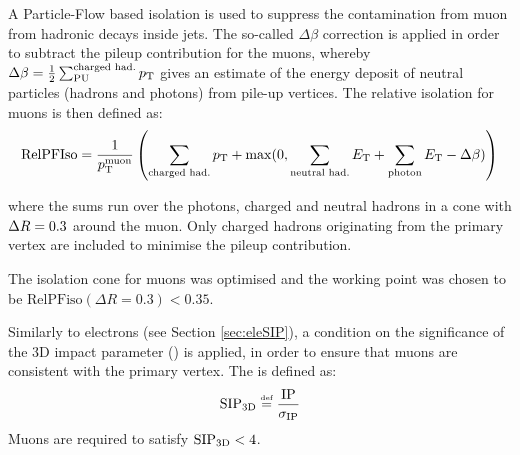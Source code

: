 A Particle-Flow based isolation is used to suppress the contamination from muon from hadronic decays inside jets.
The so-called $\Delta\beta$ correction is applied in order to subtract the pileup contribution for the muons, 
whereby $\Delta\beta = \frac{1}{2} \sum^\text{charged had.}_\text{PU} p_{\mathrm{T}}$ gives an estimate of the energy deposit of neutral particles (hadrons and photons) from pile-up vertices.
The relative isolation for muons is then defined as:
\begin{equation}
\text{RelPFIso} = \frac{1}{p_{\mathrm{T}}^\text{muon}} \left( \sum_\text{charged had.} p_{\mathrm{T}} + \max(0, \sum_\text{neutral had.} E_{\mathrm{T}} + \sum_\text{photon} E_{\mathrm{T}} - \Delta \beta) \right)
\label{eqn:mupfiso}
\end{equation}

where the sums run over the photons, charged and neutral hadrons in a cone with $\Delta R = 0.3$ around the muon.
Only charged hadrons originating from the primary vertex are included to minimise the pileup contribution.

The isolation cone for muons was optimised and the working point was chosen to be $\text{RelPFiso}(\Delta R = 0.3) < 0.35$. 

Similarly to electrons (see Section \ref{sec:eleSIP}), a condition on the significance of the 3D impact parameter (\SIPthreeD) is applied,
in order to ensure that muons are consistent with the primary vertex.
The \SIPthreeD{} is defined as:
\begin{equation}
\mathrm{SIP}_{\mathrm{3D}} \stackrel{\text{\tiny def}}{=} \frac{\rm IP}{\sigma_{\rm IP}}
\end{equation}
Muons are required to satisfy $\mathrm{SIP}_{\mathrm{3D}} < 4$.
